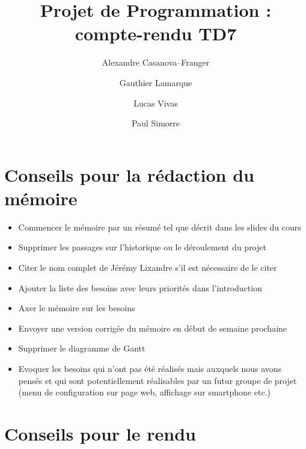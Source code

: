 \documentclass[a4paper]{article}
\title{Projet de Programmation : compte-rendu TD7}
\author{Alexandre Casanova--Franger\and Gauthier Lamarque\and Lucas Vivas\and Paul Simorre}
\begin{document}
\maketitle

\section{Conseils pour la rédaction du mémoire}

\begin{itemize}

\item Commencer le mémoire par un résumé tel que décrit dans les slides du cours
\item Supprimer les passages sur l'historique ou le déroulement du projet
\item Citer le nom complet de Jérémy Lixandre s'il est nécessaire de le citer
\item Ajouter la liste des besoins avec leurs priorités dans l'introduction
\item Axer le mémoire sur les besoins
\item Envoyer une version corrigée du mémoire en début de semaine prochaine
\item Supprimer le diagramme de Gantt
\item Evoquer les besoins qui n'ont pas été réalisés mais auxquels nous avons pensés et qui sont potentiellement réalisables par un futur groupe de projet (menu de configuration sur page web, affichage sur smartphone etc.)

\end{itemize}

\section{Conseils pour le rendu}
\end{document}
